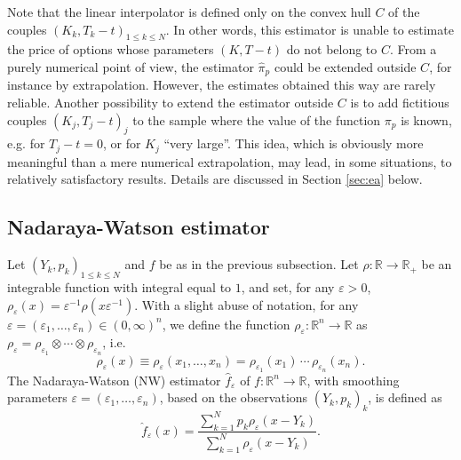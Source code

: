 \documentclass[11pt]{article}
\theoremstyle{remark}
\newcommand{\erre}{\mathbb{R}}
\newcommand{\ds}{\displaystyle}
\begin{document}
\medskip

Note that the linear interpolator is defined only on the convex hull
$C$ of the couples $(K_k,T_k-t)_{1\leq k\leq N}$. In other words, this
estimator is unable to estimate the price of options whose parameters
$(K,T-t)$ do not belong to $C$. From a purely numerical point of view,
the estimator $\hat{\pi}_p$ could be extended outside $C$, for
instance by extrapolation. However, the estimates obtained this way
are rarely reliable. Another possibility to extend the estimator
outside $C$ is to add fictitious couples $(K_j,T_j-t)_j$ to the sample
where the value of the function $\pi_p$ is known, e.g. for $T_j-t=0$,
or for $K_j$ ``very large''. This idea, which is obviously more
meaningful than a mere numerical extrapolation, may lead, in some
situations, to relatively satisfactory results. Details are discussed
in Section \ref{sec:ea} below.



\subsection{Nadaraya-Watson estimator}
\label{ssec:NW}
Let $(Y_k,p_k)_{1 \leq k \leq N}$ and $f$ be as in the previous
subsection. Let $\rho:\erre \to \erre_+$ be an integrable function
with integral equal to $1$, and set, for any $\varepsilon>0$,
$\rho_\varepsilon(x)=\varepsilon^{-1} \rho(x \varepsilon^{-1})$.  With
a slight abuse of notation, for any
$\varepsilon = (\varepsilon_1,\ldots,\varepsilon_n) \in (0,\infty)^n$,
we define the function $\rho_\varepsilon:\erre^n \to \erre$ as
$\rho_\varepsilon = \rho_{\varepsilon_1} \otimes \cdots \otimes
\rho_{\varepsilon_n}$, i.e.
\[
\rho_\varepsilon(x) \equiv \rho_\varepsilon(x_1,\ldots,x_n)
 = \rho_{\varepsilon_1}(x_1) \, \cdots \, \rho_{\varepsilon_n}(x_n).
\]
%
The Nadaraya-Watson (NW) estimator $\hat{f}_\varepsilon$ of
$f:\erre^n \to \erre$, with smoothing parameters
$\varepsilon=(\varepsilon_1,\ldots,\varepsilon_n)$, based on the
observations $(Y_k,p_k)_k$, is defined as
\[
\hat{f}_\varepsilon(x) = \frac{\ds \sum_{k=1}^N p_k \rho_\varepsilon(x-Y_k)}%
{\ds \sum_{k=1}^N \rho_\varepsilon(x-Y_k)}.
\]
\end{document}
